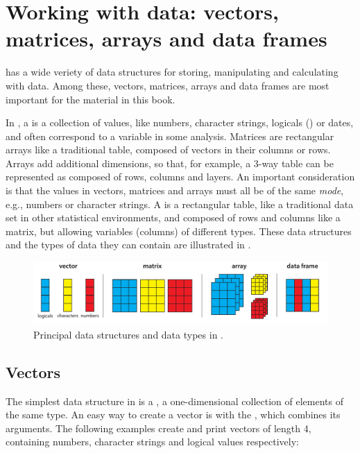 \documentclass[11pt]{book}\usepackage[]{graphicx}\usepackage[]{color}
\begin{document}
\section{Working with \R data: vectors, matrices, arrays and data frames}\label{sec:Rdata}

\R has a wide veriety of data structures for storing, manipulating and
calculating with data.  Among these, vectors, matrices, arrays and
data frames are most important for the material in this book. 

In \R, a  is a collection of values, like numbers, character strings, logicals () 
or dates, and often correspond to a variable in some analysis.
Matrices are rectangular arrays like a traditional table, composed of vectors in their columns
or rows.  
Arrays add additional dimensions, so that, for example, a 3-way table can be represented
as composed of rows, columns and layers.
An important consideration is that the values in vectors,
matrices and arrays must all be of the same \emph{mode}, e.g., numbers or character strings.
A  is a rectangular table, like a traditional data set in other
statistical environments, and composed of rows and columns like a matrix,
but allowing variables (columns) of different types. These data structures and the types of
data they can contain are illustrated in .

\begin{figure}
\includegraphics[width=\textwidth]{ch02/fig/datatypes2}
\caption[Principal data structures and data types in R]{Principal data structures and data types in \R.}
\label{fig:datatypes}
\end{figure}
\subsection{Vectors}
The simplest data structure in \R is a , a one-dimensional
collection of elements of the same type. An easy way to create a vector is with
the , which combines its arguments.  The following examples create
and print vectors of length 4, containing numbers, character strings and
logical values respectively:
\end{document}
